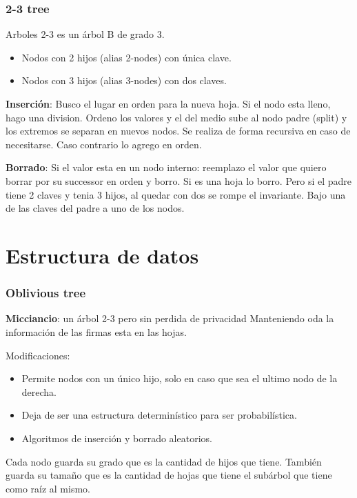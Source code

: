 \documentclass[10pt]{beamer}
\begin{document}
\begin{frame}
\frametitle{2-3 tree}

Arboles 2-3 es un árbol B de grado 3.
\begin{itemize}
  \item Nodos con 2 hijos (alias 2-nodes) con única clave.
  \item Nodos con 3 hijos (alias 3-nodes) con dos claves.
\end{itemize}

\pause
\textbf{Inserción}: Busco el lugar en orden para la nueva hoja. Si el nodo esta lleno, hago una division.
Ordeno los valores y el del medio sube al nodo padre (split) y los extremos se separan en nuevos nodos.
Se realiza de forma recursiva en caso de necesitarse.
Caso contrario lo agrego en orden.

\pause
\textbf{Borrado}: Si el valor esta en un nodo interno: reemplazo el valor que quiero borrar por su
successor en orden y borro.
Si es una hoja lo borro. Pero si el padre tiene 2 claves y tenia 3 hijos, al quedar con dos se rompe el invariante.
Bajo una de las claves del padre a uno de los nodos.
\end{frame}




\section{Estructura de datos}
\begin{frame}
\frametitle{Oblivious tree}

\textbf{Micciancio}: un árbol 2-3 pero sin perdida de privacidad Manteniendo oda la información de las firmas esta en las hojas.

Modificaciones:
\begin{itemize}
\pause
  \item Permite nodos con un único hijo, solo en caso que sea el ultimo nodo de la derecha.
\pause
  \item Deja de ser una estructura determinístico para ser probabilística.
  \item Algoritmos de inserción y borrado aleatorios.
\end{itemize}

\pause
Cada nodo guarda su grado que es la cantidad de hijos que tiene.
También guarda su tamaño que es la cantidad de hojas que tiene el subárbol que tiene como
raíz al mismo.
\end{frame}
\end{document}
